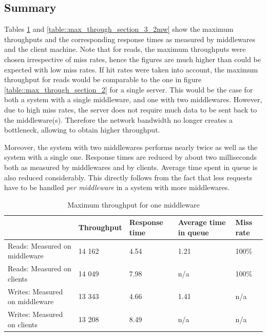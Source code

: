 \documentclass[11pt,a4paper]{article}
\begin{document}
\subsection{Summary}
Tables \ref{table::max_through_section_3_1mw} and \ref{table::max_through_section_3_2mw} show the maximum throughputs and the corresponding response times as measured by middlewares and the client machine. Note that for reads, the maximum throughputs were chosen irrespective of miss rates, hence the figures are much higher than could be expected with low miss rates. If hit rates were taken into account, the maximum throughput for reads would be comparable to the one in figure \ref{table::max_through_section_2} for a single server. This would be the case for both a system with a single middleware, and one with two middlewares. However, due to high miss rates, the server does not require much data to be sent back to the middleware(s). Therefore the network bandwidth no longer creates a bottleneck, allowing to obtain higher throughput.

Moreover, the system with two middlewares performs nearly twice as well as the system with a single one. Response times are reduced by about two milliseconds both as measured by middlewares and by clients. Average time spent in queue is also reduced considerably. This directly follows from the fact that less requests have to be handled \textit{per middleware} in a system with more middlewares.


\begin{table}[!h]
    \centering
    \begin{tabular}{|l|p{2cm}|p{2cm}|p{2cm}|p{2cm}|}
        \hline                                & Throughput & Response time & Average time in queue & Miss rate \\
        \hline Reads: Measured on middleware  &     14 162 &          4.54 &                  1.21 &     100\% \\
        \hline Reads: Measured on clients     &     14 049 &          7.98 & n/a                   &     100\% \\
        \hline Writes: Measured on middleware &     13 343 &          4.66 &                  1.41 & n/a       \\
        \hline Writes: Measured on clients    &     13 208 &          8.49 & n/a                   & n/a       \\
        \hline
    \end{tabular}
    \caption{Maximum throughput for one middleware}
    \label{table::max_through_section_3_1mw}
\end{table}
\end{document}
